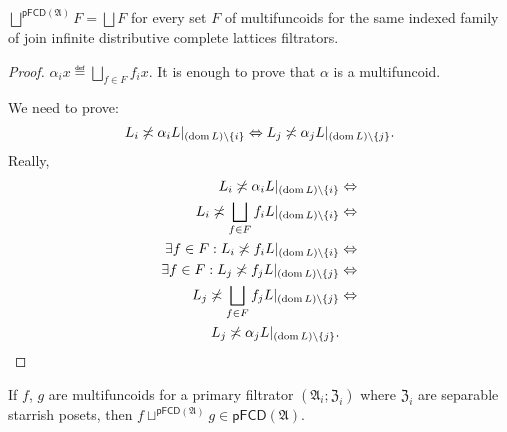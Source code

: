 \begin{thm}
$\bigsqcup^{\mathsf{pFCD}(\mathfrak{A})}F=\bigsqcup F$ for every
set $F$ of multifuncoids for the same indexed family of join infinite
distributive complete lattices filtrators.\end{thm}
\begin{proof}
$\alpha_{i}x\eqdef\bigsqcup_{f\in F}f_{i}x$. It is enough to prove
that $\alpha$ is a multifuncoid.

We need to prove: 
\[
L_{i}\not\asymp\alpha_{i}L|_{(\operatorname{dom} L)\setminus\{i\}}\Leftrightarrow L_{j}\not\asymp\alpha_{j}L|_{(\operatorname{dom} L)\setminus\{j\}}.
\]
Really,
\begin{align*}
L_{i}\not\asymp\alpha_{i}L|_{(\operatorname{dom} L)\setminus\{i\}} & \Leftrightarrow\\
L_{i}\not\asymp\bigsqcup_{f\in F}f_{i}L|_{(\operatorname{dom} L)\setminus\{i\}} & \Leftrightarrow\\
\exists f\in F:L_{i}\not\asymp f_{i}L|_{(\operatorname{dom} L)\setminus\{i\}} & \Leftrightarrow\\
\exists f\in F:L_{j}\not\asymp f_{j}L|_{(\operatorname{dom} L)\setminus\{j\}} & \Leftrightarrow\\
L_{j}\not\asymp\bigsqcup_{f\in F}f_{j}L|_{(\operatorname{dom} L)\setminus\{j\}} & \Leftrightarrow\\
L_{j}\not\asymp\alpha_{j}L|_{(\operatorname{dom} L)\setminus\{j\}}.
\end{align*}
\end{proof}
\begin{thm}
If $f$, $g$ are multifuncoids for a primary filtrator $(\mathfrak{A}_{i};\mathfrak{Z}_{i})$
where $\mathfrak{Z}_{i}$ are separable starrish posets, then $f\sqcup^{\mathsf{pFCD}(\mathfrak{A})}g\in\mathsf{pFCD}(\mathfrak{A})$.\end{thm}
